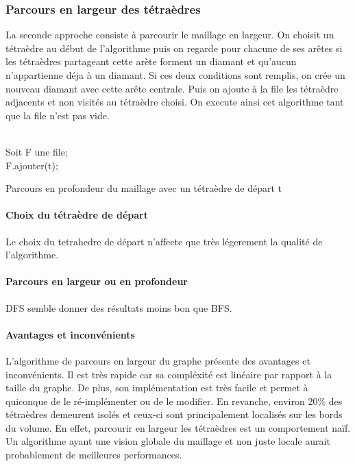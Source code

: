 \documentclass[a4paper,11pt,openany]{article}
\begin{document}
\subsubsection{Parcours en largeur des tétraèdres}
\noindent
La seconde approche consiste à parcourir le maillage en largeur. On choisit un tétraèdre au début de l'algorithme puis on regarde pour chacune de ses arêtes si les tétraèdres partageant cette arète forment un diamant et qu'aucun n'appartienne déja à un diamant. Si ces deux conditions sont remplis, on crée un nouveau diamant avec cette arête centrale. Puis on ajoute à la file les tétraèdre adjacents et non visités au tétraèdre choisi. On execute ainsi cet algorithme tant que la file n'est pas vide.\\\\
\begin{algorithm}[H]
\SetAlgoLined	
 Soit F une file;\\
 F.ajouter(t);\\
 \caption{Parcours en profondeur du maillage avec un tétraèdre de départ t}
\end{algorithm}

\paragraph{Choix du tétraèdre de départ}
Le choix du tetrahedre de départ n'affecte que très légerement la qualité de l'algorithme.
\begin{figure}[H]
\begin{center}
\end{center}
\end{figure}
\noindent
\paragraph{Parcours en largeur ou en profondeur}
DFS semble donner des résultats moins bon que BFS.

\paragraph{Avantages et inconvénients}
L'algorithme de parcours en largeur du graphe présente des avantages et inconvénients. Il est très rapide car sa compléxité est linéaire par rapport à la taille du graphe. De plus, son implémentation est très facile et permet à quiconque de le ré-implémenter ou de le modifier. En revanche, environ 20\% des tétraèdres demeurent isolés et ceux-ci sont principalement localisés sur les bords du volume. En effet, parcourir en largeur les tétraèdres est un comportement naïf. Un algorithme ayant une vision globale du maillage et non juste locale aurait probablement de meilleures performances. 
\end{document}
